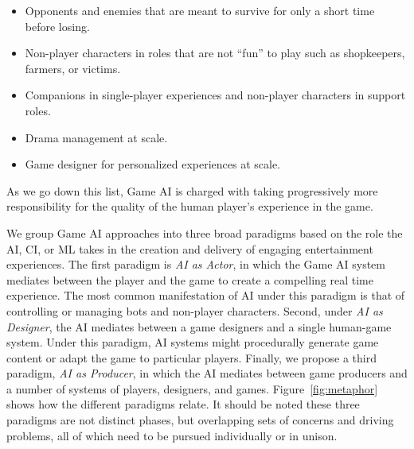 \documentclass[conference]{IEEEtran}
\begin{document}
\begin{itemize}
\item Opponents and enemies that are meant to survive for only a short time before losing.
\item Non-player characters in roles that are not ``fun'' to play such as shopkeepers, farmers, or victims.
\item Companions in single-player experiences and non-player characters in support roles.
\item Drama management at scale.
\item Game designer for personalized experiences at scale.
\end{itemize}

\noindent
As we go down this list, Game AI is charged with taking progressively more responsibility for the quality of the human player's experience in the game.

%
We group Game AI approaches into three broad paradigms based on the role the AI, CI, or ML takes in the creation and delivery of engaging entertainment experiences.
The first paradigm is {\em AI as Actor}, in which the Game AI system mediates between the player and the game to create a compelling real time experience.
The most common manifestation of AI under this paradigm is that of controlling or managing bots and non-player characters.
Second, under {\em AI as Designer}, the AI mediates between a game designers and a single human-game system.
Under this paradigm, AI systems might procedurally generate game content or adapt the game to particular players.
Finally, we propose a third paradigm, {\em AI as Producer}, in which the AI mediates between game producers and a number of systems of players, designers, and games.
Figure~\ref{fig:metaphor} shows how the different paradigms relate.
%
It should be noted these three paradigms are not distinct phases, but overlapping sets of concerns and driving problems, all of which need to be pursued individually or in unison.
\end{document}
